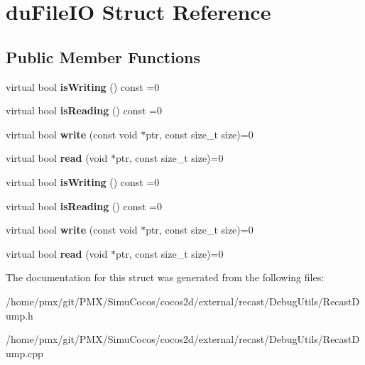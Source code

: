 \hypertarget{structduFileIO}{}\section{du\+File\+IO Struct Reference}
\label{structduFileIO}
\subsection*{Public Member Functions}
\begin{DoxyCompactItemize}
\item 
\mbox{\label{structduFileIO_ab436e18b116c61875dbdf5faafda9694}} 
virtual bool {\bfseries is\+Writing} () const =0
\item 
\mbox{\label{structduFileIO_a853e4af9415fdaa073bb785151f6b28c}} 
virtual bool {\bfseries is\+Reading} () const =0
\item 
\mbox{\label{structduFileIO_aec33f1c0d1d0d1ec464fc1a5c135cb00}} 
virtual bool {\bfseries write} (const void $\ast$ptr, const size\+\_\+t size)=0
\item 
\mbox{\label{structduFileIO_af9c0d46a4697c00c657fa75636d0cf67}} 
virtual bool {\bfseries read} (void $\ast$ptr, const size\+\_\+t size)=0
\item 
\mbox{\label{structduFileIO_ab436e18b116c61875dbdf5faafda9694}} 
virtual bool {\bfseries is\+Writing} () const =0
\item 
\mbox{\label{structduFileIO_a853e4af9415fdaa073bb785151f6b28c}} 
virtual bool {\bfseries is\+Reading} () const =0
\item 
\mbox{\label{structduFileIO_aec33f1c0d1d0d1ec464fc1a5c135cb00}} 
virtual bool {\bfseries write} (const void $\ast$ptr, const size\+\_\+t size)=0
\item 
\mbox{\label{structduFileIO_af9c0d46a4697c00c657fa75636d0cf67}} 
virtual bool {\bfseries read} (void $\ast$ptr, const size\+\_\+t size)=0
\end{DoxyCompactItemize}


The documentation for this struct was generated from the following files\+:\begin{DoxyCompactItemize}
\item 
/home/pmx/git/\+P\+M\+X/\+Simu\+Cocos/cocos2d/external/recast/\+Debug\+Utils/Recast\+Dump.\+h\item 
/home/pmx/git/\+P\+M\+X/\+Simu\+Cocos/cocos2d/external/recast/\+Debug\+Utils/Recast\+Dump.\+cpp\end{DoxyCompactItemize}
